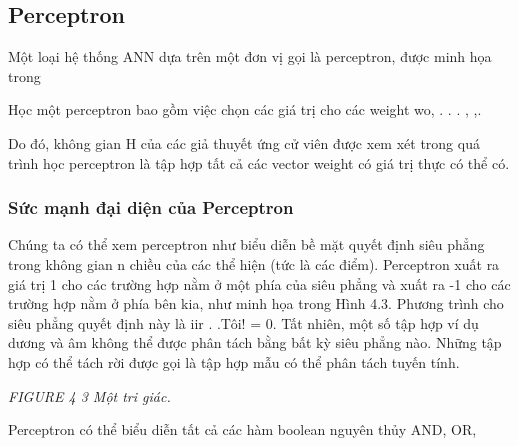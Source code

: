 \subsection{Perceptron}

Một loại hệ thống ANN dựa trên một đơn vị gọi là perceptron, được minh họa trong

Học một perceptron bao gồm việc chọn các giá trị cho các weight wo, . . . , ,.

Do đó, không gian H của các giả thuyết ứng cử viên được xem xét trong quá trình học perceptron là tập hợp tất cả các vector weight có giá trị thực có thể có.

\subsubsection{Sức mạnh đại diện của Perceptron}

Chúng ta có thể xem perceptron như biểu diễn bề mặt quyết định siêu phẳng trong không gian n chiều của các thể hiện (tức là các điểm). Perceptron xuất ra giá trị 1 cho các trường hợp nằm ở một phía của siêu phẳng và xuất ra -1 cho các trường hợp nằm ở phía bên kia, như minh họa trong Hình 4.3. Phương trình cho siêu phẳng quyết định này là iir . .Tôi! = 0. Tất nhiên, một số tập hợp ví dụ dương và âm không thể được phân tách bằng bất kỳ siêu phẳng nào. Những tập hợp có thể tách rời được gọi là tập hợp mẫu có thể phân tách tuyến tính.

\noindent\textit{FIGURE 4 3 Một tri giác.}

Perceptron có thể biểu diễn tất cả các hàm boolean nguyên thủy AND, OR,

